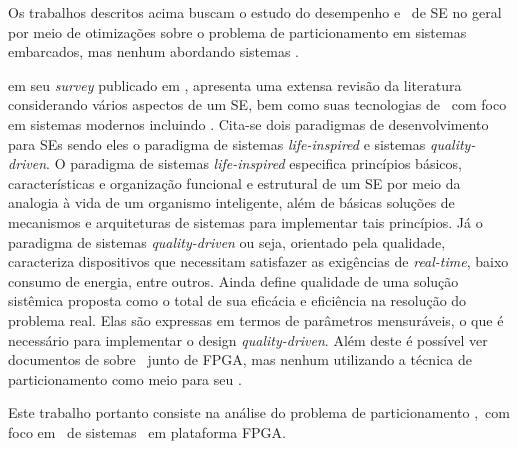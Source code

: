     
    
    Os trabalhos descritos acima buscam o estudo do desempenho e \design\ de SE no geral por meio de otimizações sobre o problema de particionamento em sistemas embarcados, mas nenhum abordando sistemas \wearables.
    
    
    
    
    \citeauthor{Jozwiak2017} em seu \textit{survey} publicado em \citeyear{Jozwiak2017}, apresenta uma extensa revisão da literatura considerando vários aspectos de um SE, bem como suas tecnologias de \design\ com foco em sistemas modernos incluindo \wearables.
    Cita-se dois paradigmas de desenvolvimento para SEs sendo eles o paradigma de sistemas \textit{life-inspired} e sistemas \textit{quality-driven}.
    O paradigma de sistemas \textit{life-inspired} especifica princípios básicos, características e organização funcional e estrutural de um SE por meio da analogia à vida de um organismo inteligente, além de básicas soluções de mecanismos e arquiteturas de sistemas para implementar tais princípios. 
    Já o paradigma de sistemas \textit{quality-driven} ou seja, orientado pela qualidade, caracteriza dispositivos que necessitam satisfazer as exigências de \textit{real-time}, baixo consumo de energia, entre outros. 
    Ainda define qualidade de uma solução sistêmica proposta como o total de sua eficácia e eficiência na resolução do problema real. 
    Elas são expressas em termos de parâmetros mensuráveis, o que é necessário para implementar o design \textit{quality-driven}.
    Além deste é possível ver documentos de \citet{Plessl2003, Ahola2007, Abdelhedi2016, Narumi2016, Lee2015} sobre \wearables\ junto de FPGA, mas nenhum utilizando a técnica de particionamento como meio para seu \design.
    
    
    
    Este trabalho portanto consiste na análise do problema de particionamento \hs,\  com foco em \design\ de sistemas \wearables\ em plataforma FPGA.
    
